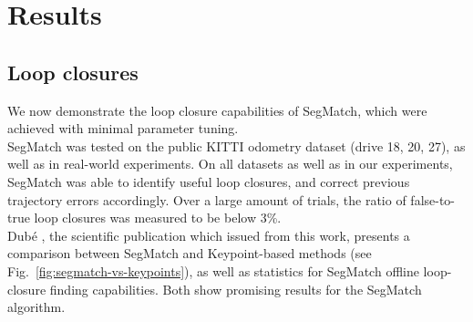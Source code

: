 \section{Results}
\label{sec:segmatch-results}


\subsection{Loop closures}

We now demonstrate the loop closure capabilities of SegMatch, which were achieved with minimal parameter tuning.\\

SegMatch was tested on the public KITTI odometry dataset (drive 18, 20, 27), as well as in real-world experiments. On all datasets as well as in our experiments, SegMatch was able to identify useful loop closures, and correct previous trajectory errors accordingly. Over a large amount of trials, the ratio of false-to-true loop closures was measured to be below 3\%.\\

Dubé \cite{segmatch}, the scientific publication which issued from this work, presents a comparison between SegMatch and Keypoint-based methods (see Fig.~\ref{fig:segmatch-vs-keypoints}), as well as statistics for SegMatch offline loop-closure finding capabilities. Both show promising results for the SegMatch algorithm.\\

